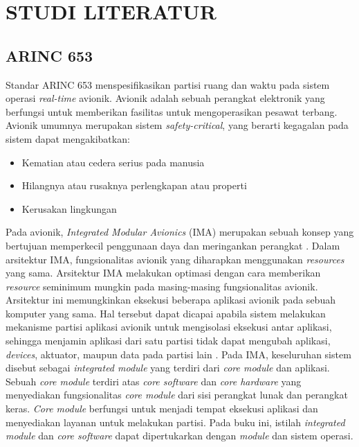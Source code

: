 \chapter{STUDI LITERATUR}

\section{ARINC 653}

Standar ARINC 653 menspesifikasikan partisi ruang dan waktu pada sistem operasi
\textit{real-time} avionik.  Avionik adalah sebuah perangkat elektronik yang berfungsi untuk
memberikan fasilitas untuk mengoperasikan pesawat terbang.  Avionik umumnya merupakan sistem
\textit{safety\hyp critical}, yang berarti kegagalan pada sistem dapat mengakibatkan:

\begin{itemize}

    \item Kematian atau cedera serius pada manusia

    \item Hilangnya atau rusaknya perlengkapan atau properti

    \item Kerusakan lingkungan

\end{itemize}

Pada avionik, \textit{Integrated Modular Avionics} (IMA) merupakan sebuah konsep yang bertujuan
memperkecil penggunaan daya dan meringankan perangkat \citep[p.~2.A.2-1]{Garside2009}.  Dalam
arsitektur IMA, fungsionalitas avionik yang diharapkan menggunakan \textit{resources} yang sama.
Arsitektur IMA melakukan optimasi dengan cara memberikan \textit{resource} seminimum mungkin
pada masing-masing fungsionalitas avionik.  Arsitektur ini memungkinkan eksekusi beberapa
aplikasi avionik pada sebuah komputer yang sama.  Hal tersebut dapat dicapai apabila sistem
melakukan mekanisme partisi aplikasi avionik untuk mengisolasi eksekusi antar aplikasi, sehingga
menjamin aplikasi dari satu partisi tidak dapat mengubah aplikasi, \textit{devices}, aktuator,
maupun data pada partisi lain \citep[pp.~11-12]{Rushby2000}.  Pada IMA, keseluruhan sistem
disebut sebagai \textit{integrated module} yang terdiri dari \textit{core module} dan aplikasi.
Sebuah \textit{core module} terdiri atas \textit{core software} dan \textit{core hardware} yang
menyediakan fungsionalitas \textit{core module} dari sisi perangkat lunak dan perangkat keras.
\textit{Core module} berfungsi untuk menjadi tempat eksekusi aplikasi dan menyediakan layanan
untuk melakukan partisi.  Pada buku ini, istilah \textit{integrated module} dan \textit{core
software} dapat dipertukarkan dengan \textit{module} dan sistem operasi.

